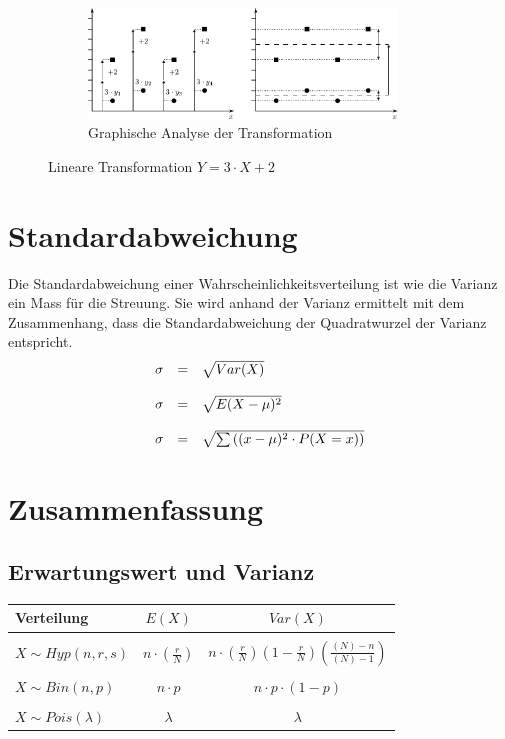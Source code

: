 \begin{figure}[h!]
\rule[1mm]{0mm}{5mm}

\begin{subfigure}[b]{1\textwidth}
\centering
\includegraphics[width=0.9\textwidth]{lintrans.pdf}
\caption{Graphische Analyse der Transformation}
\end{subfigure}

\caption{Lineare Transformation $Y = 3 \cdot X + 2$}
\label{fig:lintrans}
\end{figure}

\section{Standardabweichung}
Die Standardabweichung einer Wahrscheinlichkeitsverteilung 
ist wie die Varianz ein Mass für die Streuung. Sie 
wird anhand der Varianz ermittelt mit dem Zusammenhang, dass die 
Standardabweichung der Quadratwurzel der Varianz entspricht.
\[ \begin{array}{l c l} 
	\sigma 
		& = 
		& \sqrt{Var(X)} \\
	& & \\
	\sigma
		& =
		& \sqrt{E(X-\mu)^2} \\
	& & \\
	\sigma
		& =
		& \sqrt{\sum \left( (x-\mu)^2 \cdot P(X=x) \right)}
\end{array} \]

\section{Zusammenfassung}

\subsection{Erwartungswert und Varianz}

\begin{table}[h!]
	\centering
	\begin{tabular}{l c c}
		Verteilung
			& $E(X)$
			& $Var(X)$ \\
		\hline
		& & \\
		$X \sim Hyp(n,r,s)$
			& $n \cdot \left(\frac{r}{N}\right)$
			& $n \cdot \left( 
				\frac{r}{N}
				\right) 
			\left( 
				1 - \frac{r}{N}
			\right)
			\left(
				\frac{(N)-n}{(N)-1}
			\right)$ \\
		& & \\
		$X \sim Bin(n,p)$
			& $n \cdot p$
			& $n \cdot p \cdot (1-p)$ \\
		& & \\
		$X \sim Pois(\lambda)$
			& $\lambda$
			& $\lambda$
	\end{tabular}
\end{table}

